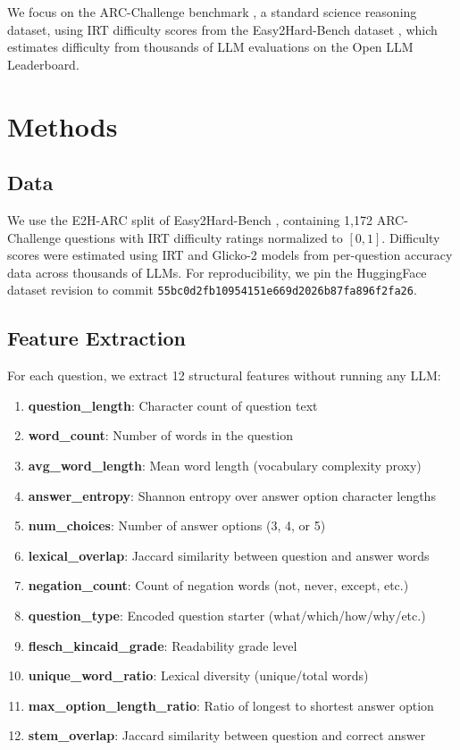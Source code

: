 \documentclass[11pt,a4paper]{article}
\begin{document}
We focus on the ARC-Challenge benchmark \citep{clark2018think}, a standard science reasoning dataset, using IRT difficulty scores from the Easy2Hard-Bench dataset \citep{wang2024easy2hard}, which estimates difficulty from thousands of LLM evaluations on the Open LLM Leaderboard.

\section{Methods}

\subsection{Data}

We use the E2H-ARC split of Easy2Hard-Bench \citep{wang2024easy2hard}, containing 1{,}172 ARC-Challenge questions with IRT difficulty ratings normalized to $[0, 1]$. Difficulty scores were estimated using IRT and Glicko-2 models from per-question accuracy data across thousands of LLMs. For reproducibility, we pin the HuggingFace dataset revision to commit \texttt{55bc0d2fb10954151e669d2026b87fa896f2fa26}.

\subsection{Feature Extraction}

For each question, we extract 12 structural features without running any LLM:

\begin{enumerate}
    \item \textbf{question\_length}: Character count of question text
    \item \textbf{word\_count}: Number of words in the question
    \item \textbf{avg\_word\_length}: Mean word length (vocabulary complexity proxy)
    \item \textbf{answer\_entropy}: Shannon entropy over answer option character lengths
    \item \textbf{num\_choices}: Number of answer options (3, 4, or 5)
    \item \textbf{lexical\_overlap}: Jaccard similarity between question and answer words
    \item \textbf{negation\_count}: Count of negation words (not, never, except, etc.)
    \item \textbf{question\_type}: Encoded question starter (what/which/how/why/etc.)
    \item \textbf{flesch\_kincaid\_grade}: Readability grade level
    \item \textbf{unique\_word\_ratio}: Lexical diversity (unique/total words)
    \item \textbf{max\_option\_length\_ratio}: Ratio of longest to shortest answer option
    \item \textbf{stem\_overlap}: Jaccard similarity between question and correct answer
\end{enumerate}
\end{document}
